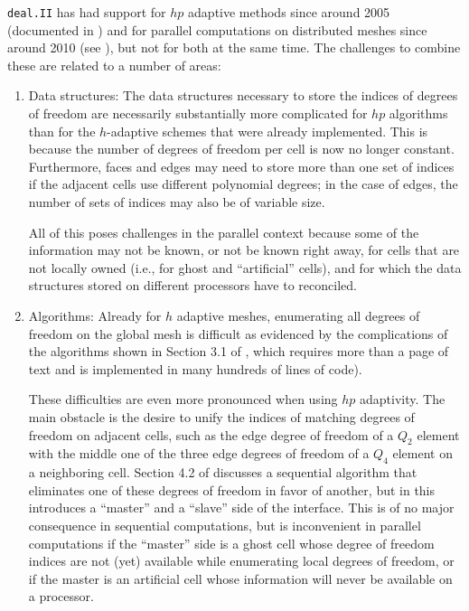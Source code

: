 \documentclass{ansarticle-preprint}
\newcommand{\specialword}[1]{\texttt{#1}}
\newcommand{\dealii}{{\specialword{deal.II}}\xspace}
\begin{document}
\dealii{} has had support for $hp$ adaptive methods since around 2005
(documented in \cite{BangerthKayserHerold2007}) and for parallel
computations on distributed meshes since around 2010 (see
\cite{BangerthBursteddeHeisterKronbichler11}), but not for both at the
same time. The challenges to combine these are related to a number of
areas:
\begin{enumerate}
\item Data structures: The data structures necessary to store the
  indices of degrees of freedom are necessarily substantially more
  complicated for $hp$ algorithms than for the $h$-adaptive schemes
  that were already implemented. This is because the number of degrees
  of freedom per cell is now no longer constant. Furthermore,
  faces and edges may need to store more than one set of indices if
  the adjacent cells use different polynomial degrees; in the case of
  edges, the number of sets of indices may also be of variable size.

  All of this poses challenges in the parallel context because some of
  the information may not be known, or not be known right away, for
  cells that are not locally owned (i.e., for ghost and ``artificial''
  cells), and for which the data structures stored on different
  processors have to reconciled.

\item Algorithms: Already for $h$ adaptive meshes, enumerating all
  degrees of freedom on the global mesh is difficult as evidenced by
  the complications of the algorithms shown in Section 3.1 of
  \cite{BangerthBursteddeHeisterKronbichler11}, which requires more
  than a page of text and is implemented in many hundreds of lines of
  code).

  These difficulties are even more pronounced when using $hp$
  adaptivity. The main obstacle is the desire to unify the indices of
  matching degrees of freedom on adjacent cells, such as the edge
  degree of freedom of a $Q_2$ element with the middle one of
  the three edge degrees of freedom of a $Q_4$ element on a
  neighboring cell. Section 4.2 of
  \cite{BangerthKayserHerold2007} discusses a sequential algorithm
  that eliminates one of these degrees of freedom in favor of another,
  but in this introduces a ``master'' and a ``slave'' side of the
  interface. This is of no major consequence in sequential
  computations, but is inconvenient in parallel computations if the
  ``master'' side is a ghost cell whose degree of freedom indices are
  not (yet) available while enumerating local degrees of freedom, or
  if the master is an artificial cell whose information will never be
  available on a processor.


\end{enumerate}
\end{document}
